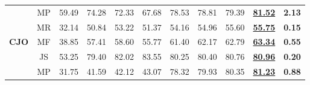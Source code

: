 \begin{table*}[htbp]
\begin{tabular}{@{}c|c|cccc|cc|c|c|c@{}}
                                          & MP                                & 59.49                    & 74.28                    & 72.33                   & 67.68                   & 78.53                                                     & 78.81                                                    & 79.39                                                                                      & \underline{\textbf{81.52}}                                                                & \textbf{2.13}                     \\
                                          & MR                                & 32.14                    & 50.84                    & 53.22                   & 51.37                   & 54.16                                                     & 54.96                                                    & 55.60                                                                                      & \underline{\textbf{55.75}}                                                                & \textbf{0.15}                     \\
        \textbf{CJO}                      & MF                               & 38.85                    & 57.41                    & 58.60                   & 55.77                   & 61.40                                                     & 62.17                                                    & 62.79                                                                                      & \underline{\textbf{63.34}}                                                               & \textbf{0.55}                     \\
                                          & JS                                & 53.25                    & 79.40                    & 82.02                   & 83.55                   & 80.25                                                     & 80.40                                                    & 80.76                                                                                      &\underline{\textbf{80.96}}                                                                & \textbf{0.20}                     \\
                                          & MP                                & 31.75                    & 41.59                    & 42.12                   & 43.07                   & 78.32                                                     & 79.93                                                    & 80.35                                                                                      & \underline{\textbf{81.23}}                                                                & \textbf{0.88}                     \\

\end{tabular}
\end{table*}
